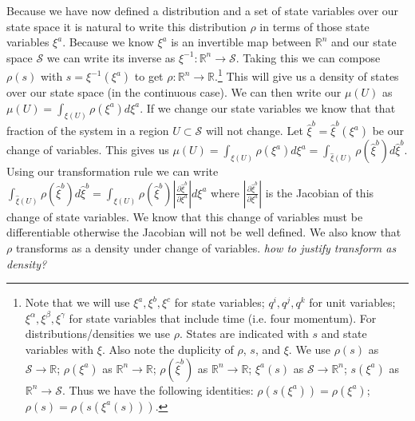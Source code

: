 \documentclass{article}
\begin{document}
	Because we have now defined a distribution and a set of state variables over our state space it is natural to write this distribution $\rho$ in terms of those state variables $\xi^a$. Because we know $\xi^a$ is an invertible map between $\mathbb{R}^n$ and our state space $\mathcal{S}$ we can write its inverse as $\xi^{-1} : \mathbb{R}^n \to \mathcal{S}$. Taking this we can compose $\rho(s)$ with $s = \xi^{-1}(\xi^a)$ to get $\rho : \mathbb{R}^n \to \mathbb{R}$.\footnote{Note that we will use $\xi^a, \xi^b, \xi^c$ for state variables; $q^i, q^j, q^k$ for unit variables; $\xi^\alpha, \xi^\beta, \xi^\gamma$ for state variables that include time (i.e. four momentum). For distributions/densities we use $\rho$. States are indicated with $s$ and state variables with $\xi$. Also note the duplicity of $\rho$, $s$, and $\xi$. We use $\rho(s)$ as $\mathcal{S} \to \mathbb{R}$; $\rho(\xi^a)$ as $\mathbb{R}^n \to \mathbb{R}$; $\rho(\hat{\xi}^b)$ as $\mathbb{R}^n \to \mathbb{R}$; $\xi^a(s)$ as $\mathcal{S} \to \mathbb{R}^n$; $s(\xi^a)$ as $\mathbb{R}^n \to \mathcal{S}$.
Thus we have the following identities: $\rho(s(\xi^a)) = \rho(\xi^a)$; $\rho(s) = \rho(s (\xi^a(s)))$.} This will give us a density of states over our state space (in the continuous case). We can then write our $\mu(U)$ as $\mu(U) = \int_{\xi(U)} \rho(\xi^a)d\xi^a$. If we change our state variables we know that that fraction of the system in a region $U \subset \mathcal{S}$ will not change. Let $\hat{\xi}^b = \hat{\xi}^b(\xi^a)$ be our change of variables. This gives us $\mu(U) = \int_{\xi(U)} \rho(\xi^a)d\xi^a = \int_{\hat{\xi}(U)} \rho(\hat{\xi}^b)d\hat{\xi}^b$. Using our transformation rule we can write $\int_{\hat{\xi}(U)} \rho(\hat{\xi}^b)d\hat{\xi}^b = \int_{\xi(U)} \rho(\hat{\xi}^b)\left|\frac{\partial\hat{\xi}^b}{\partial\xi^a}\right|d\xi^a$ where $\left|\frac{\partial\hat{\xi}^b}{\partial\xi^a}\right|$ is the Jacobian of this change of state variables. We know that this change of variables must be differentiable otherwise the Jacobian will not be well defined. We also know that $\rho$ transforms as a density under change of variables. \emph{how to justify transform as density?}
\end{document}
